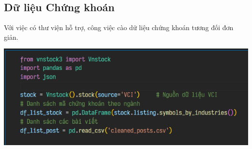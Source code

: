 \subsection{Dữ liệu Chứng khoán}

Với việc có thư viện hỗ trợ, công việc cào dữ liệu chứng khoán tương đối đơn giản.

\begin{center}
    \centering
    \includegraphics[width=0.75\linewidth]{images/code-1.11-crawllib.png}
\end{center}

